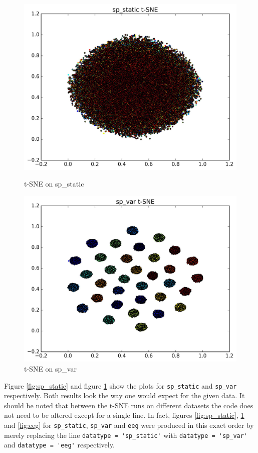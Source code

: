 \documentclass{article} %
\begin{document}
\begin{figure}
	\centering
	\begin{minipage}{0.5\textwidth}
		\centering
		\includegraphics[width=1.0\textwidth]{sp_static.jpg}
		\caption{t-SNE on sp\_static}
		\label{fig:sp_static}
	\end{minipage}\hfill
	\begin{minipage}{0.5\textwidth}
		\centering
		\includegraphics[width=1.0\textwidth]{sp_var.jpg}
		\caption{t-SNE on sp\_var}
		\label{fig:sp_var}
	\end{minipage}
\end{figure}

Figure \ref{fig:sp_static} and figure \ref{fig:sp_var} show the plots for \verb|sp_static| and \verb|sp_var| respectively. Both results look the way one would expect for the given data.
It should be noted that between the t-SNE runs on different datasets the code does not need to be altered except for a single line. In fact, figures \ref{fig:sp_static}, \ref{fig:sp_var} and \ref{fig:eeg} for \verb|sp_static|, \verb|sp_var| and \verb|eeg| were produced in this exact order by merely replacing the line \verb|datatype = 'sp_static'| with \verb|datatype = 'sp_var'| and \verb|datatype = 'eeg'| respectively.
\end{document}
